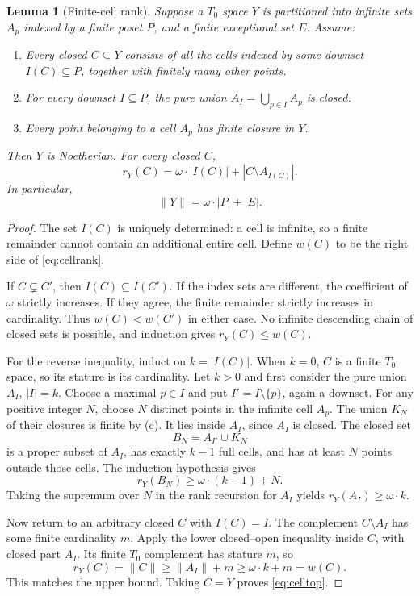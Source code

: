 \documentclass[11pt,a4paper]{article}
\newtheorem{lemma}[lemma]{Lemma}
\theoremstyle{definition}
\newcommand{\st}[1]{\lVert #1\rVert}
\numberwithin{equation}{section}
\begin{document}
\begin{lemma}[Finite-cell rank]\label{lem:cells}
Suppose a $T_0$ space $Y$ is partitioned into infinite sets $A_p$ indexed
by a finite poset $P$, and a finite exceptional set $E$.  Assume:
\begin{enumerate}[label=\textup{(\alph*)}]
\item Every closed $C\subseteq Y$ consists of all the cells indexed by
      some downset $I(C)\subseteq P$, together with finitely many other
      points.
\item For every downset $I\subseteq P$, the pure union
      $A_I=\bigcup_{p\in I}A_p$ is closed.
\item Every point belonging to a cell $A_p$ has finite closure in $Y$.
\end{enumerate}
Then $Y$ is Noetherian.  For every closed $C$,
\begin{equation}\label{eq:cellrank}
 r_Y(C)=\omega\cdot|I(C)|+|C\setminus A_{I(C)}|.
\end{equation}
In particular,
\begin{equation}\label{eq:celltop}
 \st Y=\omega\cdot|P|+|E|.
\end{equation}
\end{lemma}
\begin{proof}
The set $I(C)$ is uniquely determined: a cell is infinite, so a finite
remainder cannot contain an additional entire cell.  Define $w(C)$ to
be the right side of \eqref{eq:cellrank}.

If $C\subsetneq C'$, then $I(C)\subseteq I(C')$.  If the index sets
are different, the coefficient of $\omega$ strictly increases.  If
they agree, the finite remainder strictly increases in cardinality.
Thus $w(C)<w(C')$ in either case.  No infinite descending chain of
closed sets is possible, and induction gives $r_Y(C)\leq w(C)$.

For the reverse inequality, induct on $k=|I(C)|$.  When $k=0$, $C$ is
a finite $T_0$ space, so its stature is its cardinality.
Let $k>0$ and first consider the pure union $A_I$, $|I|=k$.
Choose a maximal $p\in I$ and put $I'=I\setminus\{p\}$, again a downset.
For any positive integer $N$, choose $N$ distinct points in the infinite
cell $A_p$.  The union $K_N$ of their closures is finite by (c).
It lies inside $A_I$, since $A_I$ is closed.  The closed set
\[
 B_N=A_{I'}\cup K_N
\]
is a proper subset of $A_I$, has exactly $k-1$ full cells, and has at
least $N$ points outside those cells.  The induction hypothesis gives
\[
 r_Y(B_N)\geq\omega\cdot(k-1)+N.
\]
Taking the supremum over $N$ in the rank recursion for $A_I$ yields
$r_Y(A_I)\geq\omega\cdot k$.

Now return to an arbitrary closed $C$ with $I(C)=I$.  The complement
$C\setminus A_I$ has some finite cardinality $m$.  Apply the lower
closed--open inequality inside $C$, with closed part $A_I$.  Its finite
$T_0$ complement has stature $m$, so
\[
 r_Y(C)=\st C\geq\st{A_I}+m\geq\omega\cdot k+m=w(C).
\]
This matches the upper bound.  Taking $C=Y$ proves \eqref{eq:celltop}.
\end{proof}
\end{document}
